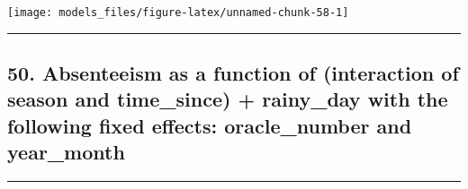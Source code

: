 \documentclass[]{article}
\begin{document}
\begin{center}\texttt{[image: models\_files/figure-latex/unnamed-chunk-58-1]} \end{center}

\newpage

\begin{center}\rule{0.5\linewidth}{\linethickness}\end{center}

\subsection{50. Absenteeism as a function of (interaction of season and
time\_since) + rainy\_day with the following fixed effects:
oracle\_number and
year\_month}\label{absenteeism-as-a-function-of-interaction-of-season-and-time_since-rainy_day-with-the-following-fixed-effects-oracle_number-and-year_month}

\begin{center}\rule{0.5\linewidth}{\linethickness}\end{center}
\end{document}
